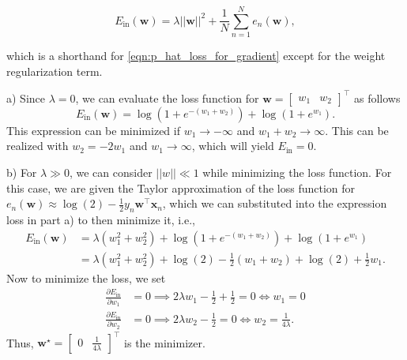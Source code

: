 \documentclass{article}
\newcommand{\mat}[1]{\begin{bmatrix}#1\end{bmatrix}}
\begin{document}
    \begin{equation}
        E_{\text{in}}(\mathbf{w}) = \lambda ||\mathbf{w}||^2 + 
        \frac{1}{N}\sum_{n=1}^N e_n(\mathbf{w}),
    \end{equation}

    which is a shorthand for \eqref{eqn:p_hat_loss_for_gradient} 
    except for the weight regularization term.

    a) Since $\lambda = 0$, we can evaluate the loss function
    for $\mathbf{w} = \mat{w_1 & w_2}^\top$ as follows
    \[
        E_{\text{in}}(\mathbf{w}) = \log(1+e^{-(w_1 + w_2)}) +
        \log(1+e^{w_1}).
    \]
    This expression can be minimized if $w_1 \to -\infty$ and
    $w_1 + w_2 \to \infty$. This can be realized with $w_2 = -2w_1$
    and $w_1 \to \infty$, which will yield $E_{\text{in}} = 0$.

    b) For $\lambda \gg 0$, we can consider $||w||\ll1$ while 
    minimizing the loss function. For this case, we are given the
    Taylor approximation of the loss function for $e_n(\mathbf{w}) 
    \approx \log(2) - \frac{1}{2}y_n\mathbf{w}^\top\mathbf{x}_n$, 
    which we can substituted into the expression loss in part a) to
    then minimize it, i.e.,
    \begin{align*}
        E_{\text{in}}(\mathbf{w}) &= \lambda (w_1^2+w_2^2) + 
        \log(1+e^{-(w_1 + w_2)}) + \log(1+e^{w_1})\\
        &= \lambda (w_1^2+w_2^2) + \log(2) -\frac{1}{2}(w_1 + w_2)
        + \log(2) + \frac{1}{2}w_1.
    \end{align*}
    Now to minimize the loss, we set
    \begin{align*}
        \frac{\partial E_{\text{in}} }{\partial w_1} &= 0 \implies
         2\lambda w_1 -\frac{1}{2}+\frac{1}{2}=0 \iff w_1= 0\\
         \frac{\partial E_{\text{in}} }{\partial w_2} &= 0 \implies
         2\lambda w_2 -\frac{1}{2} = 0 \iff w_2=\frac{1}{4\lambda}.
    \end{align*}
    Thus, $\mathbf{w}^\star = \mat{0 & \frac{1}{4\lambda}}^\top$ 
    is the minimizer.
\end{document}
